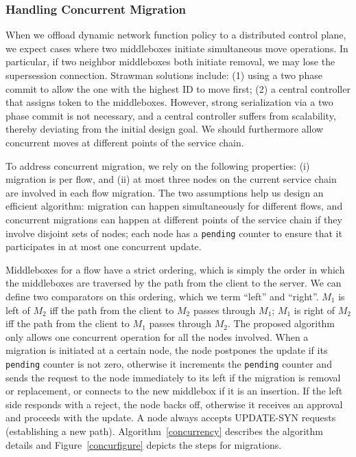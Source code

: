 \subsubsection{Handling Concurrent Migration}
When we offload dynamic network function policy to a distributed control plane, we expect cases where two middleboxes initiate simultaneous move operations. In particular, if two neighbor middleboxes both initiate removal, we may lose the supersession connection. Strawman solutions include: (1) using a two phase commit to allow the one with the highest ID to move first; (2) a central controller that assigns token to the middleboxes. However, strong serialization via a two phase commit is not necessary, and a central controller suffers from scalability, thereby deviating from the initial design goal. We should furthermore allow concurrent moves at different points of the service chain. 

To address concurrent migration, we rely on the following properties: (i) migration is per flow, and (ii) at most three nodes on the current service chain are involved in each flow migration. The two assumptions help us design an efficient algorithm: migration can happen simultaneously for different flows, and concurrent migrations can happen at different points of the service chain if they involve disjoint sets of nodes; each node has a \texttt{pending} counter to ensure that it participates in at most one concurrent update.


Middleboxes for a flow have a strict ordering, which is simply the order in which the middleboxes are traversed by the path from the client to the server. We can define two comparators on this ordering, which we term ``left'' and ``right''. $M_{1}$ is left of $M_{2}$ iff the path from the client to $M_{2}$ passes through $M_{1}$; $M_{1}$ is right of $M_{2}$ iff the path from the client to $M_{1}$ passes through $M_{2}$. The proposed algorithm only allows one concurrent operation for all the nodes involved. When a migration is initiated at a certain node, the node postpones the update if its \texttt{pending} counter is not zero, otherwise it increments the \texttt{pending} counter and sends the request to the node immediately to its left if the migration is removal or replacement, or connects to the new middlebox if it is an insertion. If the left side responds with a reject, the node backs off, otherwise it receives an approval and proceeds with the update. A node always accepts UPDATE-SYN requests (establishing a new path). Algorithm~\ref{concurrency} describes the algorithm details and Figure~\ref{concurfigure} depicts the steps for migrations.


